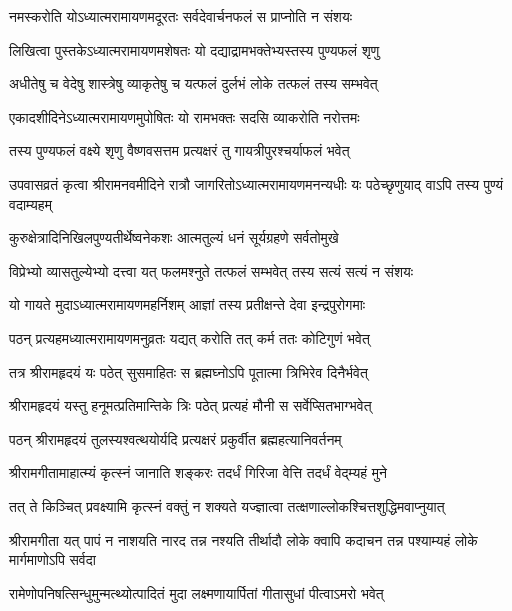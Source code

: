 \twolineshloka
{नमस्करोति योऽध्यात्मरामायणमदूरतः}
{सर्वदेवार्चनफलं स प्राप्नोति न संशयः} %

\twolineshloka
{लिखित्वा पुस्तकेऽध्यात्मरामायणमशेषतः}
{यो दद्याद्रामभक्तेभ्यस्तस्य पुण्यफलं शृणु} %

\twolineshloka
{अधीतेषु च वेदेषु शास्त्रेषु व्याकृतेषु च}
{यत्फलं दुर्लभं लोके तत्फलं तस्य सम्भवेत्} %

\twolineshloka
{एकादशीदिनेऽध्यात्मरामायणमुपोषितः}
{यो रामभक्तः सदसि व्याकरोति नरोत्तमः} %

\twolineshloka
{तस्य पुण्यफलं वक्ष्ये शृणु वैष्णवसत्तम}
{प्रत्यक्षरं तु गायत्रीपुरश्चर्याफलं भवेत्} %

\threelineshloka
{उपवासव्रतं कृत्वा श्रीरामनवमीदिने}
{रात्रौ जागरितोऽध्यात्मरामायणमनन्यधीः}
{यः पठेच्छृणुयाद् वाऽपि तस्य पुण्यं वदाम्यहम्} %

\twolineshloka
{कुरुक्षेत्रादिनिखिलपुण्यतीर्थेष्वनेकशः}
{आत्मतुल्यं धनं सूर्यग्रहणे सर्वतोमुखे} %

\twolineshloka
{विप्रेभ्यो व्यासतुल्येभ्यो दत्त्वा यत् फलमश्नुते}
{तत्फलं सम्भवेत् तस्य सत्यं सत्यं न संशयः} %

\twolineshloka
{यो गायते मुदाऽध्यात्मरामायणमहर्निशम्}
{आज्ञां तस्य प्रतीक्षन्ते देवा इन्द्रपुरोगमाः} %

\twolineshloka
{पठन् प्रत्यहमध्यात्मरामायणमनुव्रतः}
{यद्यत् करोति तत् कर्म ततः कोटिगुणं भवेत्} %

\twolineshloka
{तत्र श्रीरामहृदयं यः पठेत् सुसमाहितः}
{स ब्रह्मघ्नोऽपि पूतात्मा त्रिभिरेव दिनैर्भवेत्} %

\twolineshloka
{श्रीरामहृदयं यस्तु हनूमत्प्रतिमान्तिके}
{त्रिः पठेत् प्रत्यहं मौनी स सर्वेप्सितभाग्भवेत्} %

\twolineshloka
{पठन् श्रीरामहृदयं तुलस्यश्वत्थयोर्यदि}
{प्रत्यक्षरं प्रकुर्वीत ब्रह्महत्यानिवर्तनम्} %

\twolineshloka
{श्रीरामगीतामाहात्म्यं कृत्स्नं जानाति शङ्करः}
{तदर्धं गिरिजा वेत्ति तदर्धं वेद्म्यहं मुने} %

\twolineshloka
{तत् ते किञ्चित् प्रवक्ष्यामि कृत्स्नं वक्तुं न शक्यते}
{यज्ज्ञात्वा तत्क्षणाल्लोकश्चित्तशुद्धिमवाप्नुयात्} %

\threelineshloka
{श्रीरामगीता यत् पापं न नाशयति नारद}
{तन्न नश्यति तीर्थादौ लोके क्वापि कदाचन}
{तन्न पश्याम्यहं लोके मार्गमाणोऽपि सर्वदा} %

\twolineshloka
{रामेणोपनिषत्सिन्धुमुन्मत्थ्योत्पादितं मुदा}
{लक्ष्मणायार्पितां गीतासुधां पीत्वाऽमरो भवेत्} %

